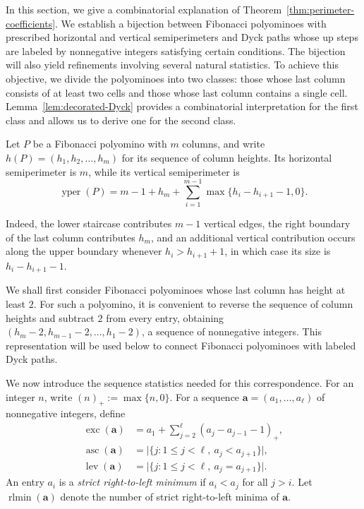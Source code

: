 \documentclass[12pt]{amsart}
\theoremstyle{plain}
\theoremstyle{definition}
\DeclareMathOperator{\lev}{lev}
\DeclareMathOperator{\asc}{asc}
\DeclareMathOperator{\rlmin}{rlmin}
\DeclareMathOperator{\yper}{yper}
\begin{document}
In this section, we give a combinatorial explanation of Theorem~\ref{thm:perimeter-coefficients}. We establish a bijection between Fibonacci polyominoes with prescribed horizontal and vertical semiperimeters and Dyck paths whose up steps are labeled by nonnegative integers satisfying  certain conditions. The bijection will also yield refinements involving several natural statistics.  To achieve this objective, we divide the polyominoes into two classes: those whose last column consists of at least two  cells and those whose last column contains a single cell. Lemma~\ref{lem:decorated-Dyck} provides a combinatorial interpretation for the first class and allows us to derive one for the second class.

Let $P$ be a Fibonacci polyomino with $m$ columns, and write $h(P)=(h_1,h_2,\ldots,h_m)$ for its sequence of column heights. Its horizontal semiperimeter is
$m$, while its vertical semiperimeter is
\begin{equation}\label{eq:yper-heights}
\yper(P)
=
m-1+h_m
+
\sum_{i=1}^{m-1}
\max\{h_i-h_{i+1}-1,0\}.
\end{equation}

Indeed, the lower staircase contributes $m-1$ vertical edges, the
right boundary of the last column contributes $h_m$, and an additional
vertical contribution occurs along the upper boundary whenever
$h_i>h_{i+1}+1$, in which case its size is $h_i-h_{i+1}-1$.


We shall first consider Fibonacci polyominoes whose last column has
height at least $2$. For such a polyomino, it is convenient to reverse
the sequence of column heights and subtract $2$ from every entry,
obtaining $(h_m-2,h_{m-1}-2,\ldots,h_1-2)$, 
a sequence of nonnegative integers. This representation will be used
below to connect Fibonacci polyominoes with labeled Dyck paths. 


We now introduce the sequence statistics needed for this correspondence.   For an integer $n$, write $(n)_+:=\max\{n,0\}$. For a sequence $\mathbf a=(a_1,\ldots,a_\ell)$ of nonnegative integers,
define 
\begin{align*}
    \operatorname{exc}(\mathbf a) &= a_1+\sum_{j=2}^{\ell}(a_j-a_{j-1}-1)_+,\\
    \asc(\mathbf{a}) &= \bigl|\{j:1\leq j<\ell,\ a_j<a_{j+1}\}\bigr|,\\
    \lev(\mathbf{a}) &= \bigl|\{j:1\leq j<\ell,\ a_j=a_{j+1}\}\bigr|.
\end{align*}  An entry $a_i$ is a \emph{strict right-to-left minimum} if $a_i<a_j$ for all $j>i$.  Let $\rlmin(\mathbf a)$ denote the number of strict right-to-left minima of $\mathbf a$. 
\end{document}
